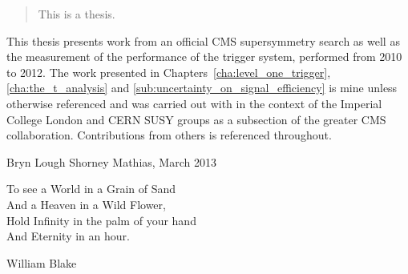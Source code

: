 \begin{abstract}
This is a thesis.

\end{abstract}


\begin{declaration}
This thesis presents work from an official CMS supersymmetry search as well as 
the measurement of the performance of the \Lone trigger system, performed from 
2010 to 2012. The work presented in Chapters~\ref{cha:level_one_trigger}, 
\ref{cha:the_t_analysis} and \ref{sub:uncertainty_on_signal_efficiency} is mine 
unless otherwise referenced and was carried out with in the context of the 
Imperial College London and CERN SUSY groups as a subsection of the greater CMS 
collaboration. Contributions from others is referenced throughout.

\vspace*{1cm}

\begin{flushright}
Bryn Lough Shorney Mathias, March 2013
\end{flushright}

\end{declaration}


\begin{preface}
\begin{centering}To see a World in a Grain of Sand\\
And a Heaven in a Wild Flower,\\
Hold Infinity in the palm of your hand \\
And Eternity in an hour.\\
\end{centering}

\begin{flushright}
William Blake
\end{flushright}
\end{preface}

